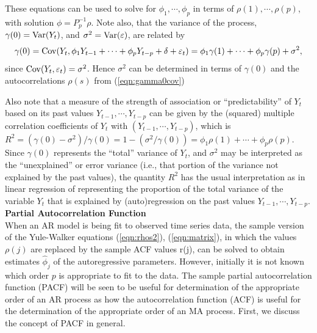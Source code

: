 These equations can be used to solve for $\phi_1,\cdots,\phi_p$ in terms of $\rho(1),\cdots,\rho(p)$, with solution $\phi = P_p^{-1}\rho$. Note also, that the variance of the process, $\gamma(0) = \operatorname{Var}(Y_t)$, and $\sigma^2= \operatorname{Var}(\varepsilon)$, are related by
	\begin{equation} \label{eqn:gamma0cov}
	\gamma(0)= \Cov(Y_t, \phi_1Y_{t-1} + \cdots + \phi_pY_{t-p} + \delta + \varepsilon_t)= \phi_1\gamma(1) + \cdots + \phi_p\gamma(p) + \sigma^2,
	\end{equation}
since $\operatorname{Cov}(Y_t, \varepsilon_t)= \sigma^2$. Hence $\sigma^2$ can be determined in terms of $\gamma(0)$ and the autocorrelations $\rho(s)$ from (\ref{eqn:gamma0cov})


Also note that a measure of the strength of association or ``predictability'' of $Y_t$ based on its past values $Y_{t-1},\cdots,Y_{t-p}$ can be given by the (squared) multiple correlation coefficients of $Y_t$ with $(Y_{t-1},\cdots,Y_{t-p})$, which is $R^2= (\gamma(0) - \sigma^2)/\gamma(0) = 1 - (\sigma^2/\gamma(0)) = \phi_1\rho(1) + \cdots + \phi_p\rho(p)$. Since $\gamma(0)$ represents the ``total'' variance of $Y_t$, and $\sigma^2$ may be interpreted as the ``unexplained'' or error variance (i.e., that portion of the variance not explained by the past values), the quantity $R^2$ has the usual interpretation as in linear regression of representing the proportion of the total variance of the variable $Y_t$ that is explained by (auto)regression on the past values $Y_{t-1},\cdots,Y_{t-p}$. \\


\noindent\textbf{Partial Autocorrelation Function} \\


When an AR model is being fit to observed time series data, the sample version of the Yule-Walker equations (\ref{eqn:rhos2}), (\ref{eqn:matrix}), in which the values $\rho(j)$ are replaced by the sample ACF values r(j), can be solved to obtain estimates $\hat{\phi}_j$ of the autoregressive parameters. However, initially it is not known which order $p$ is appropriate to fit to the data. The sample partial autocorrelation function (PACF) will be seen to be useful for determination of the appropriate order of an AR process as how the autocorrelation function (ACF) is useful for the determination of the appropriate order of an MA process. First, we discuss the concept of PACF in general.



